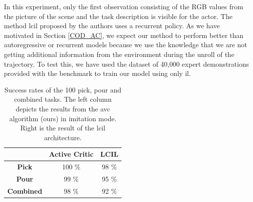 In this experiment, only the first observation consisting of the RGB values from the picture of the 
scene and the task description is visible for the actor. The method \ac{lcil} 
proposed by the authors uses a recurrent policy. As we have motivated in Section \ref{COD_AC}, we expect our method to perform better than autoregressive or recurrent 
models because we use the knowledge that we are not getting additional information from the environment during the unroll of the trajectory. 
To test this, we have used the dataset of 40,000 expert demonstrations provided with the benchmark to train our model using only \ac{il}.
\begin{table}
  \centering
  \begin{tabular}{|c|c|c|}
      \cline{2-3}
      \multicolumn{1}{c|}{} & \textbf{Active Critic} & \textbf{LCIL} \\ \hline
      \textbf{Pick} & 100 \% & 98 \% \\ \hline
      \textbf{Pour} & 99 \% & 95 \% \\ \hline
      \textbf{Combined} & 98 \% & 92 \% \\ \hline
  \end{tabular}
  \caption{Success rates of the 100 pick, pour and combined tasks. The left column depicts the results from the \ac{avc} algorithm (ours) in 
  imitation mode. Right is the result of the \ac{lcil} architecture.}
  \label{tab:lcil}
\end{table}

